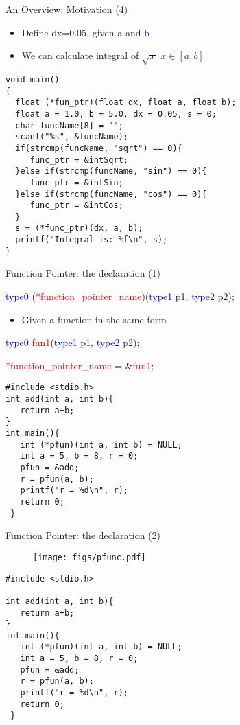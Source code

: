 \begin{frame}[fragile]{An Overview: Motivation (4)}
\begin{itemize}
	\item {Define dx=0.05, given \textcolor{blue}{a} and \textcolor{blue}{b}}
	\item {We can calculate integral of $\sqrt{x}$ $x \in [a, b]$}
\end{itemize}
\begin{lstlisting}[xleftmargin=0.08\linewidth, linewidth=0.9\linewidth,firstnumber=19]
void main()
{
  float (*fun_ptr)(float dx, float a, float b);
  float a = 1.0, b = 5.0, dx = 0.05, s = 0;
  char funcName[8] = "";
  scanf("%s", &funcName);
  if(strcmp(funcName, "sqrt") == 0){
     func_ptr = &intSqrt;
  }else if(strcmp(funcName, "sin") == 0){
	 func_ptr = &intSin;  
  }else if(strcmp(funcName, "cos") == 0){
	 func_ptr = &intCos;
  }
  s = (*func_ptr)(dx, a, b);
  printf("Integral is: %f\n", s);
}
\end{lstlisting}
\end{frame}

\begin{frame}[fragile]{Function Pointer: the declaration (1)}
\begin{center}
\Large{
   \textcolor{blue}{type0} (\textcolor{red}{*function\_pointer\_name})(\textcolor{blue}{type1} p1, \textcolor{blue}{type2} p2);
}
\end{center}
\begin{itemize}
	\item {Given a function in the same form }
\end{itemize}
\begin{center}
\Large{
\textcolor{blue}{type0} \textcolor{red}{fun1}(\textcolor{blue}{type1} p1, \textcolor{blue}{type2} p2);
}

\textcolor{red}{*function\_pointer\_name} = \&\textcolor{red}{fun1};
\end{center}

\begin{lstlisting}[xleftmargin =0.05\linewidth, linewidth=0.7\linewidth]
#include <stdio.h>
int add(int a, int b){
   return a+b;
}
int main(){
   int (*pfun)(int a, int b) = NULL;
   int a = 5, b = 8, r = 0;
   pfun = &add;
   r = pfun(a, b);
   printf("r = %d\n", r);
   return 0;
 }
\end{lstlisting}
\end{frame}

\begin{frame}[fragile]{Function Pointer: the declaration (2)}
\begin{figure}
\begin{center}
	\texttt{[image: figs/pfunc.pdf]}
\end{center}
\end{figure}
\begin{lstlisting}[xleftmargin =0.05\linewidth, linewidth=0.7\linewidth]
#include <stdio.h>

int add(int a, int b){
   return a+b;
}
int main(){
   int (*pfun)(int a, int b) = NULL;
   int a = 5, b = 8, r = 0;
   pfun = &add;
   r = pfun(a, b);
   printf("r = %d\n", r);
   return 0;
 }
\end{lstlisting}
\end{frame}

